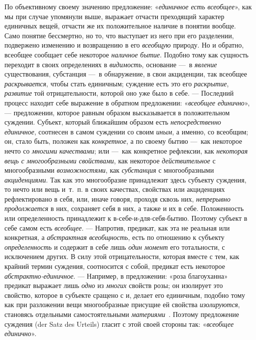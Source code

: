 \documentclass[twoside]{article}
\begin{document}
{{{{По объективному своему значению предложение:
«{\em единичное есть всеобщее}»,
как мы при случае упомянули выше, выражает отчасти преходящий
характер единичных вещей, отчасти же их положительное наличие в понятии
вообще. Само понятие бессмертно, но то, что выступает из него при его
разделении, подвержено изменению и возвращению в его
{\em всеобщую} природу.
Но и обратно, всеобщее сообщает себе некоторое
{\em наличное бытие}.
Подобно тому как сущность переходит в своих определениях в
{\em видимость},
основание —~в
{\em явление}
существования, субстанция —~в обнаружение, в
свои акциденции, так всеобщее
{\em раскрывается}, чтобы
стать единичным; суждение есть это его
{\em раскрытие},
{\em развитие} той
отрицательности, которой оно уже было в себе. — Последний
процесс находит себе выражение в обратном предложении:
«{\em всеобщее единично}», —
предложении, которое равным образом высказывается в
положительном суждении. Субъект, который ближайшим образом есть
{\em непосредственно единичное},
соотнесен в самом суждении со своим
{\em иным}, а именно,
со всеобщим; он, стало быть, положен как
{\em конкретное}, а по
своему бытию —~как некоторое нечто со
{\em многими
}{\em качествами}; или
—~как конкретное рефлексии, как
{\em некоторая вещь с многообразными
свойствами}, как некоторое
{\em действительное} с
многообразными {\em возможностями},
как {\em субстанция}
с многообразными
{\em акциденциями}. Так
как это многообразие принадлежит здесь субъекту суждения, то нечто или вещь
и~т.~п. в своих качествах, свойствах или акциденциях рефлектировано в себя,
или, иначе говоря, проходя сквозь них,
{\em непрерывно продолжается}
в них, сохраняет себя в них, а также и их в себе.
Положенность или определенность принадлежит к в-себе-и-для-себя-бытию.
Поэтому субъект в себе самом есть
{\em всеобщее}. —
Напротив, предикат, как эта не реальная или конкретная, а
{\em абстрактная всеобщность},
есть по отношению к субъекту
{\em определенность} и
содержит в себе лишь {\em один момент}
его тотальности, с исключением других. В силу этой
отрицательности, которая вместе с тем, как крайний термин суждения,
соотносится с собой, предикат есть некоторое
{\em абстрактно-единичное}. —
Например, в предложении: «роза благоуханна» предикат выражает
лишь {\em одно} из
{\em многих} свойств
розы; он изолирует это свойство, которое в субъекте сращено с и,
делает его единичным, подобно тому как при разложении вещи многообразные
присущие ей свойства {\em изолируются},
становясь отдельными самостоятельными
{\em материями}~\label{bkm:bm33}.
Поэтому предложение суждения (der Satz des Urteils)
гласит с этой своей стороны так:
«{\em всеобщее единично}».

}}}}
\end{document}
